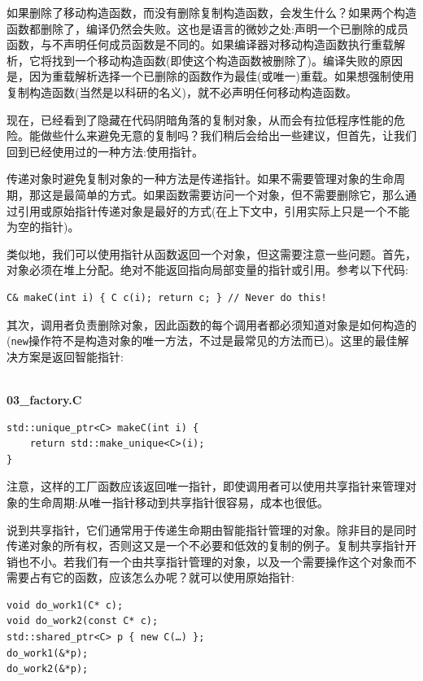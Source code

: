 如果删除了移动构造函数，而没有删除复制构造函数，会发生什么？如果两个构造函数都删除了，编译仍然会失败。这也是语言的微妙之处:声明一个已删除的成员函数，与不声明任何成员函数是不同的。如果编译器对移动构造函数执行重载解析，它将找到一个移动构造函数(即使这个构造函数被删除了)。编译失败的原因是，因为重载解析选择一个已删除的函数作为最佳(或唯一)重载。如果想强制使用复制构造函数(当然是以科研的名义)，就不必声明任何移动构造函数。 

现在，已经看到了隐藏在代码阴暗角落的复制对象，从而会有拉低程序性能的危险。能做些什么来避免无意的复制吗？我们稍后会给出一些建议，但首先，让我们回到已经使用过的一种方法:使用指针。


传递对象时避免复制对象的一种方法是传递指针。如果不需要管理对象的生命周期，那这是最简单的方式。如果函数需要访问一个对象，但不需要删除它，那么通过引用或原始指针传递对象是最好的方式(在上下文中，引用实际上只是一个不能为空的指针)。 

类似地，我们可以使用指针从函数返回一个对象，但这需要注意一些问题。首先，对象必须在堆上分配。绝对不能返回指向局部变量的指针或引用。参考以下代码:

\begin{lstlisting}[style=styleCXX]
C& makeC(int i) { C c(i); return c; } // Never do this!
\end{lstlisting}

其次，调用者负责删除对象，因此函数的每个调用者都必须知道对象是如何构造的(\texttt{new}操作符不是构造对象的唯一方法，不过是最常见的方法而已)。这里的最佳解决方案是返回智能指针:

\hspace*{\fill} \\ %
\noindent
\textbf{03\_factory.C}
\begin{lstlisting}[style=styleCXX]
std::unique_ptr<C> makeC(int i) {
	return std::make_unique<C>(i);
}
\end{lstlisting}

注意，这样的工厂函数应该返回唯一指针，即使调用者可以使用共享指针来管理对象的生命周期:从唯一指针移动到共享指针很容易，成本也很低。

说到共享指针，它们通常用于传递生命期由智能指针管理的对象。除非目的是同时传递对象的所有权，否则这又是一个不必要和低效的复制的例子。复制共享指针开销也不小。若我们有一个由共享指针管理的对象，以及一个需要操作这个对象而不需要占有它的函数，应该怎么办呢？就可以使用原始指针:

\begin{lstlisting}[style=styleCXX]
void do_work1(C* c);
void do_work2(const C* c);
std::shared_ptr<C> p { new C(…) };
do_work1(&*p);
do_work2(&*p);
\end{lstlisting}

